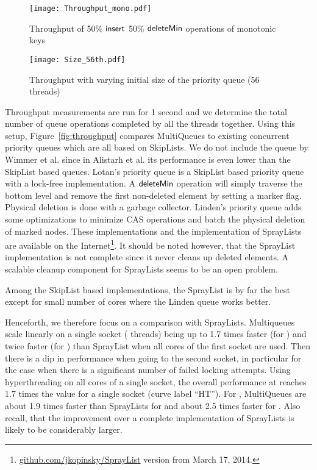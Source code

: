 \documentclass[a4paper,12pt]{article}
\newcommand{\Id}[1]{\ensuremath{\text{{\sf #1}}}}
\begin{document}
\begin{figure}
\centering\texttt{[image: Throughput\_mono.pdf]}
\caption{Throughput of 50\% \Id{insert} 50\% \Id{deleteMin} operations of monotonic keys}
\label{fig:mono}
\end{figure}

\begin{figure}
\centering\texttt{[image: Size\_56th.pdf]}
\caption{Throughput with varying initial size of the priority queue (56 threads)}
\label{fig:size}
\end{figure}


Throughput measurements are run for 1 second and we determine the total number of queue operations completed by all the threads together.
Using this setup, Figure~\ref{fig:throughput} compares
MultiQueues to existing concurrent priority queues which are all based on SkipLists. 
We do not include the queue by Wimmer et al. \cite{WVTCT14} since in Alistarh et al. \cite{AKLS14} its performance is even lower than the SkipList based queues.
Lotan's priority queue \cite{ShaLot00} is a SkipList based priority queue with a lock-free implementation. A \Id{deleteMin} operation will simply
traverse the bottom level and remove the first non-deleted element by setting a marker flag. Physical deletion is done
with a garbage collector. Linden's priority queue \cite{LinJon13} adds some optimizations to minimize CAS operations and
batch the physical deletion of marked nodes. 
These implementations and the implementation of SprayLists are available on the Internet\footnote{\url{github.com/jkopinsky/SprayList} version from March 17, 2014.}. It should be noted however, that the SprayList implementation is not complete since it never cleans up deleted elements. A scalable cleanup component for SprayLists seems to be an open problem.

Among the SkipList based implementations, the SprayList is by far the best except for small number of cores where the Linden queue works better. 

Henceforth, we therefore focus on a comparison with SprayLists.
Multiqueues scale linearly on a single socket ( threads) being up to 1.7 times faster (for ) and twice faster (for ) than SprayList when all cores of the first socket are used. Then there is a dip in performance when going to the second socket, in particular for the case  when there is a significant number of failed locking attempts. Using hyperthreading on all cores of a single socket, the overall performance at  reaches 1.7 times the value for a single socket (curve label ``HT'').
For , MultiQueues are about 1.9 times faster than SprayLists for  and about 2.5 times faster for . Also recall, that the improvement over a complete implementation of SprayLists is likely to be considerably larger.
\end{document}
